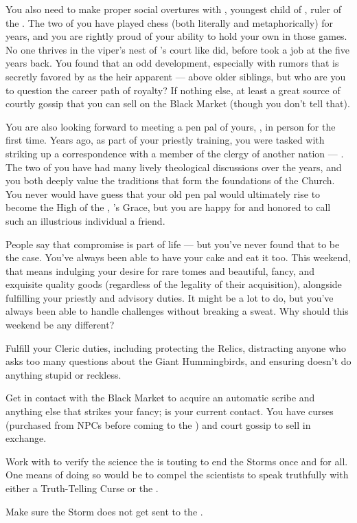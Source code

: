 \documentclass[char]{GL2020}
\begin{document}
You also need to make proper social overtures with \cPrince{\full}, youngest child of \cQueen{\full}, ruler of the \pFarm{}. The two of you have played chess (both literally and metaphorically) for years, and you are rightly proud of your ability to hold your own in those games. No one thrives in the viper’s nest of \cQueen{}’s court like \cPrince{} did, before \cPrince{} took a job at the \pSchool{} five years back. You found that an odd development, especially with rumors that \cPrince{} is secretly favored by \cQueen{} as the heir apparent — above \cPrince{\their} older siblings, but who are you to question the career path of royalty? If nothing else, at least \cPrince{\theyare} a great source of courtly gossip that you can sell on the Black Market (though you don't tell \cPrince{\them} that). 

You are also looking forward to meeting a pen pal of yours, \cAntiChup{\intro}, in person for the first time. Years ago, as part of your priestly training, you were tasked with striking up a correspondence with a member of the clergy of another nation — \cAntiChup{}. The two of you have had many lively theological discussions over the years, and you both deeply value the traditions that form the foundations of the Church. You never would have guess that your old pen pal would ultimately rise to become the High \cAntiChup{\Cleric} of the \pTech{}, \cTechGod{\intro}’s Grace, but you are happy for \cAntiChup{\them} and honored to call such an illustrious individual a friend.

People say that compromise is part of life — but you've never found that to be the case. You've always been able to have your cake and eat it too. This weekend, that means indulging your desire for rare tomes and beautiful, fancy, and exquisite quality goods (regardless of the legality of their acquisition), alongside fulfilling your priestly and advisory duties. It might be a lot to do, but you've always been able to handle challenges without breaking a sweat. Why should this weekend be any different?

\begin{itemz}
    \item Fulfill your Cleric duties, including protecting the Relics, distracting anyone who asks too many questions about the Giant Hummingbirds, and ensuring \cDisney{} doesn’t do anything stupid or reckless.
    \item Get in contact with the Black Market to acquire an automatic scribe and anything else that strikes your fancy; \cChupSecond{} is your current contact. You have curses (purchased from NPCs before coming to the \pSchool{}) and court gossip to sell in exchange.
    \item Work with \cCurse{} to verify the science the \pTech{} is touting to end the Storms once and for all. One means of doing so would be to compel the scientists to speak truthfully with either a Truth-Telling Curse or the \iLariat{}.
    \item Make sure the Storm does not get sent to the \pFarm{}.
\end{itemz}
\end{document}
